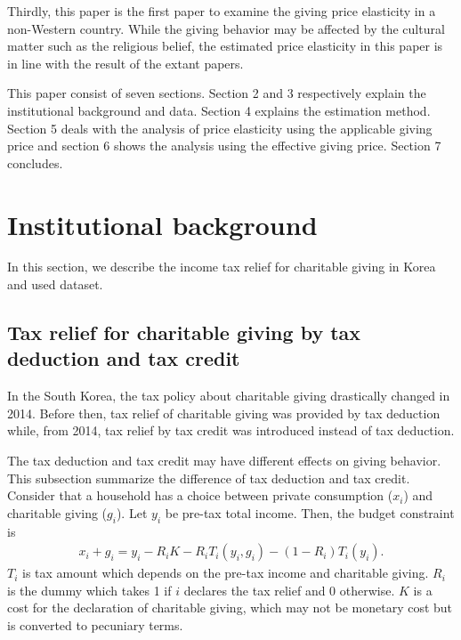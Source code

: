 \documentclass[
  11pt,
  a4paper,
]{article}
\begin{document}
Thirdly, this paper is the first paper to examine the giving price elasticity in a non-Western country. While the giving behavior may be affected by the cultural matter such as the religious belief, the estimated price elasticity in this paper is in line with the result of the extant papers.

This paper consist of seven sections. Section 2 and 3 respectively explain the institutional background and data. Section 4 explains the estimation method. Section 5 deals with the analysis of price elasticity using the applicable giving price and section 6 shows the analysis using the effective giving price. Section 7 concludes.

\hypertarget{institutional-background}{%
\section{Institutional background}\label{institutional-background}}

In this section, we describe the income tax relief for charitable giving in Korea and used dataset.

\hypertarget{tax-relief-for-charitable-giving-by-tax-deduction-and-tax-credit}{%
\subsection{Tax relief for charitable giving by tax deduction and tax credit}\label{tax-relief-for-charitable-giving-by-tax-deduction-and-tax-credit}}

In the South Korea, the tax policy about charitable giving drastically changed in 2014. Before then, tax relief of charitable giving was provided by tax deduction while, from 2014, tax relief by tax credit was introduced instead of tax deduction.

The tax deduction and tax credit may have different effects on giving behavior. This subsection summarize the difference of tax deduction and tax credit.
Consider that a household has a choice between private consumption (\(x_i\)) and charitable giving (\(g_i\)). Let \(y_i\) be pre-tax total income.
Then, the budget constraint is
\begin{align}
    x_i + g_i = y_i − R_iK - R_iT_i(y_i, g_i) - (1-R_i)T_i(y_i).
\end{align}
\(T_i\) is tax amount which depends on the pre-tax income and charitable giving.
\(R_i\) is the dummy which takes 1 if \(i\) declares the tax relief and 0 otherwise. \(K\) is a cost for the declaration of charitable giving, which may not be monetary cost but is converted to pecuniary terms.
\end{document}
